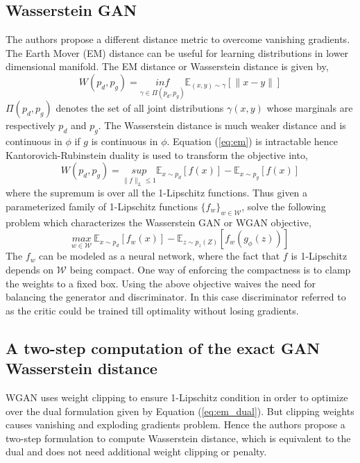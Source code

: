 \subsection*{Wasserstein GAN  \citep{arjovskyWGAN}}  The authors propose a different distance metric to overcome vanishing gradients. The Earth Mover (EM) distance can be useful for learning distributions in lower dimensional manifold. The EM distance or Wasserstein distance is given by, 
\begin{equation}
    \label{eq:em}
    W(p_{d}, p_{g}) = \underset{\gamma \in \Pi(p_{d}, p_{g})}{inf} \mathbb{E}_{(x,y)\sim \gamma}[\parallel x - y \parallel]
\end{equation}{}
$\Pi(p_{d},p_{g})$ denotes the set of all joint distributions $\gamma(x, y)$ whose marginals are respectively $p_{d}$ and $p_{g}$. The Wasserstein distance is much weaker distance and is continuous in $\phi$ if $g$ is continuous in $\phi$. Equation (\ref{eq:em}) is intractable hence Kantorovich-Rubinstein duality is used to transform the objective into,
\begin{equation}
    \label{eq:em_dual}
    W(p_{d}, p_{g}) = \underset{\parallel f\parallel_{L}\leq 1}{sup} \mathbb{E}_{x\sim p_{d}} [f(x)] - \mathbb{E}_{x\sim p_{g}} [f(x)]
\end{equation}{}
where the supremum is over all the 1-Lipschitz functions. Thus given a parameterized family of 1-Lipschitz functions $\{f_{w}\} _{w\in \mathcal{W}}$,  solve the following problem which characterizes the Wasserstein GAN or WGAN objective, 
\begin{equation}
    \label{eq:wgan}
    \underset{w\in \mathcal{W}}{max} \ \mathbb{E}_{x\sim p_{d}} [f_{w}(x)] - \mathbb{E}_{z\sim p_{z}(Z)} [f_{w}(g_{\phi}(z))]
\end{equation}{}
The $f_{w}$ can be modeled as a neural network, where the fact that $f$ is 1-Lipschitz depends on $\mathcal{W}$ being compact. One way of enforcing the compactness is to clamp the weights to a fixed box. Using the above objective waives the need for balancing the generator and discriminator. In this case discriminator referred to as the critic could be trained till optimality without losing gradients.  

\subsection*{A two-step computation of the exact GAN Wasserstein distance \citep{wgan_ts}} WGAN uses weight clipping to ensure 1-Lipschitz condition in order to optimize over the dual formulation given by Equation (\ref{eq:em_dual}). But clipping weights causes vanishing and exploding gradients problem. Hence the authors propose a two-step formulation to compute Wasserstein distance, which is equivalent to the dual and does not need additional weight clipping or penalty.

